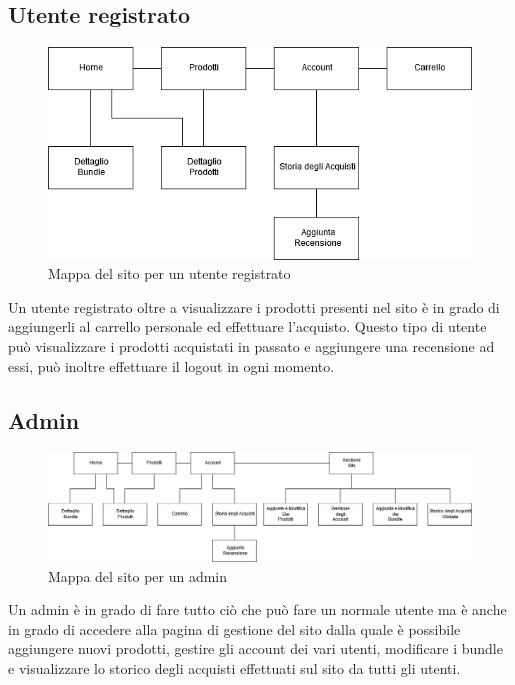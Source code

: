 \subsection{Utente registrato}
\begin{figure}[h]
	\label{UR} 
	\centering 
	\includegraphics[width=1\textwidth]{immagini/UR.png}
	\caption{Mappa del sito per un utente registrato} 
\end{figure}
Un utente registrato oltre a visualizzare i prodotti presenti nel sito è in grado di aggiungerli al carrello personale ed effettuare l'acquisto.
Questo tipo di utente può visualizzare i prodotti acquistati in passato e aggiungere una recensione ad essi, può inoltre effettuare il logout in ogni momento.

\subsection{Admin}
\begin{figure}[h]
	\label{figuragattino} 
	\centering %
	\includegraphics[width=1\textwidth]{immagini/admin.png}
	\caption{Mappa del sito per un admin} 
\end{figure}
Un admin è in grado di fare tutto ciò che può fare un normale utente ma è anche in grado di accedere alla pagina di gestione del sito dalla quale è possibile aggiungere nuovi prodotti, gestire gli account dei vari utenti, modificare i bundle e visualizzare lo storico degli acquisti effettuati sul sito da tutti gli utenti.